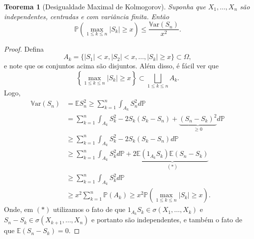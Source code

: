 \documentclass[12pt,a4paper,oneside]{book}
\newtheorem{theorem}{Teorema}[section]
\theoremstyle{definition}
\theoremstyle{remark}
\numberwithin{equation}{section}
\newcommand{\E}{\mathbb{E}}
\newcommand{\pr}{\mathbb{P}}
\newcommand{\Var}{\mathbb{V}\text{ar}}
\begin{document}
\begin{theorem}[Desigualdade Maximal de Kolmogorov]\label{teo-desiMaxKolmo}
Suponha que $X_1,\dots,X_n$ são independentes, centradas e com variância finita. Então
$$\pr\left( \max_{1\leq k\leq n} |S_k|\geq x   \right)\leq \dfrac{\Var(S_n)}{x^2}. $$
\end{theorem}
\begin{proof}
Defina
$$A_k = \{|S_1|<x,|S_2|<x,\dots,|S_k|\geq x\}\subset \Omega, $$
e note que os conjuntos acima são disjuntos. Além disso, é fácil ver que
$$\left\lbrace\max_{1\leq k\leq n} |S_k|\geq x \right\rbrace\subset \bigsqcup_{1\leq k\leq n} A_k. $$
Logo,
\begin{align*}
\Var(S_n) &= \E S_n^2 \geq  \sum_{k=1}^n\int_{A_k} S_n^2 d\pr\\
& = \sum_{k=1}^n\int_{A_k}S_k^2 - 2S_k(S_k-S_n)+  \underbrace{(S_n-S_k)^2}_{\geq 0} d\pr\\
& \geq  \sum_{k=1}^n\int_{A_k}S_k^2 - 2S_k(S_k-S_n) d\pr\\
& \geq \sum_{k=1}^n \int_{A_k}S_k^2d\pr +2\underbrace{\E(1_{A_k}S_k)\E(S_n-S_k)}_{(*)} \\
& \geq \sum_{k=1}^n \int_{A_k}S_k^2d\pr \\
&\geq  x^2 \sum_{k=1}^n \pr(A_k) \geq x^2 \pr\left( \max_{1\leq k\leq n} |S_k|\geq x   \right).
\end{align*}
Onde, em $(*)$ utilizamos o fato de que $1_{A_k}S_k \in \sigma(X_1,\dots,X_k)$ e $S_n-S_k\in \sigma(X_{k+1},\dots,X_n)$ e portanto são independentes, e também o fato de que $\E(S_n-S_k)=0$.

\end{proof}
\end{document}
